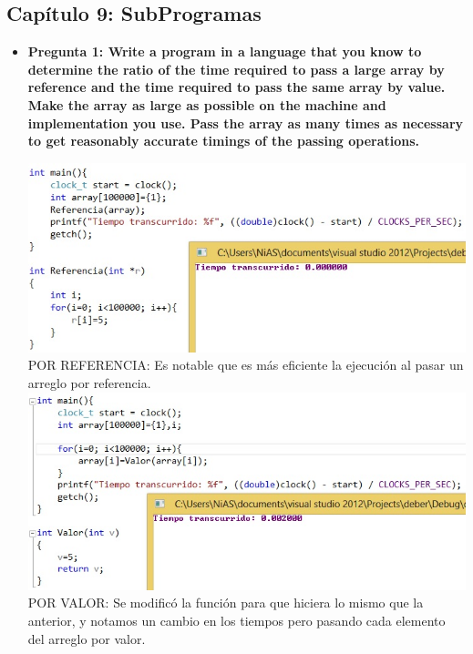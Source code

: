 \documentclass[12pt,oneside]{article}
\begin{document}
		\subsection{Capítulo 9: SubProgramas}      
			\begin{itemize}
				\item {\bf Pregunta 1: Write a program in a language that you know to determine the ratio of the time required to pass a large array by reference and the time required to pass the same array by value. Make the array as large as possible on the 						machine and implementation you use. Pass the array as many times as necessary to get reasonably accurate timings of the passing operations.}
					\begin{center}
						\includegraphics[scale=0.5]{Imagenes/7.jpg}\\
						POR REFERENCIA: Es notable que es más eficiente la ejecución al pasar un arreglo por referencia.\\
						\includegraphics[scale=0.5]{Imagenes/8.jpg}\\
						POR VALOR: Se modificó la función para que hiciera lo mismo que la anterior, y notamos un cambio en los tiempos pero pasando cada elemento del arreglo por valor.
					\end{center}
					
			\end{itemize}


\end{document}

